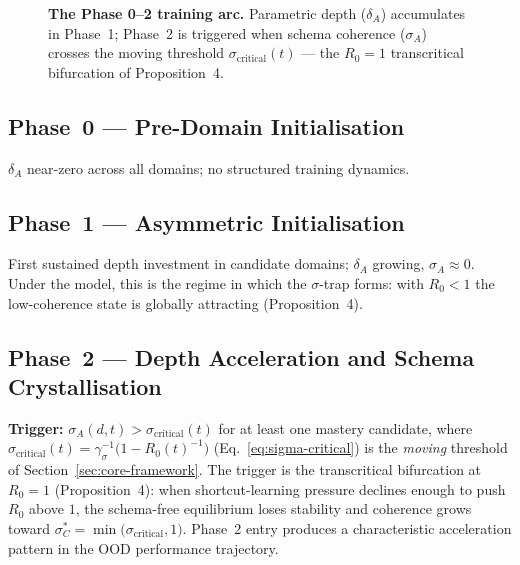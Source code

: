 \documentclass{article}
\providecommand{\Description}[1]{}
\theoremstyle{definition}
\begin{document}
\begin{figure}[htbp]
\centering
\resizebox{\textwidth}{!}{}
\caption{\textbf{The Phase 0--2 training arc.} Parametric depth
($\delta_A$) accumulates in Phase~1; Phase~2 is triggered when schema
coherence ($\sigma_A$) crosses the moving threshold
$\sigma_{\text{critical}}(t)$ --- the $R_0 = 1$ transcritical
bifurcation of Proposition~4.}
\Description{A time-series plot with Training Time on the x-axis and Normalised Value [0,1] on the y-axis. Three curves: delta_A_relative (solid black logistic curve), sigma_A (solid blue, crosses sigma_critical at a red star marker at the Phase 1-2 boundary then rises sharply). Background shading delineates the phases.}
\label{fig:phases}
\end{figure}

\subsection*{Phase~0 --- Pre-Domain Initialisation}

$\delta_A$ near-zero across all domains; no structured training
dynamics.

\subsection*{Phase~1 --- Asymmetric Initialisation}

First sustained depth investment in candidate domains; $\delta_A$
growing, $\sigma_A \approx 0$. Under the model, this is the regime in
which the $\sigma$-trap forms: with $R_0 < 1$ the low-coherence state
is globally attracting (Proposition~4).

\subsection*{Phase~2 --- Depth Acceleration and Schema Crystallisation}

\textbf{Trigger:} $\sigma_A(d,t) > \sigma_{\text{critical}}(t)$ for at
least one mastery candidate, where
$\sigma_{\text{critical}}(t) = \gamma_\sigma^{-1}\bigl(1 - R_0(t)^{-1}\bigr)$
(Eq.~\eqref{eq:sigma-critical}) is the \emph{moving} threshold of
Section~\ref{sec:core-framework}. The trigger is the transcritical
bifurcation at $R_0 = 1$ (Proposition~4): when
shortcut-learning pressure declines enough to push $R_0$ above $1$, the
schema-free equilibrium loses stability and coherence grows toward
$\sigma_C^* = \min\bigl(\sigma_{\text{critical}}, 1\bigr)$. Phase~2
entry produces a characteristic acceleration pattern in the OOD
performance trajectory.
\end{document}
